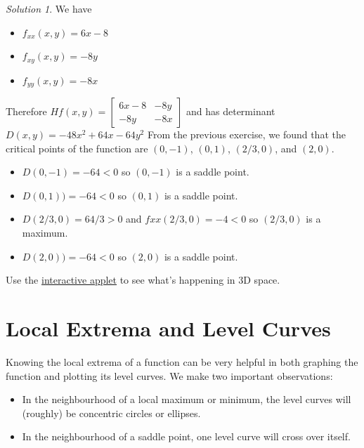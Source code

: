 \documentclass[
]{book}
\providecommand{\tightlist}{%
  \setlength{\itemsep}{0pt}\setlength{\parskip}{0pt}}
\theoremstyle{definition}
\theoremstyle{definition}
\theoremstyle{definition}
\theoremstyle{definition}
\theoremstyle{remark}
\newtheorem*{solution}{Solution}
\begin{document}
\begin{solution}

We have

\begin{itemize}
\tightlist
\item
  \(f_{xx}(x,y)=6x-8\)
\item
  \(f_{xy}(x,y)=-8y\)
\item
  \(f_{yy}(x,y)=-8x\)
\end{itemize}

Therefore \(Hf(x,y)=\begin{bmatrix} 6x-8 & -8y\\-8y & -8x\end{bmatrix}\) and has determinant \(D(x,y)=-48x^2+64x-64y^2\)
From the previous exercise, we found that the critical points of the function are \((0,-1)\), \((0,1)\), \((2/3, 0)\), and \((2,0)\).

\begin{itemize}
\tightlist
\item
  \(D(0,-1)=-64 <0\) so \((0,-1)\) is a saddle point.
\item
  \(D(0,1))=-64 <0\) so \((0, 1)\) is a saddle point.
\item
  \(D(2/3,0)=64/3 >0\) and \(f{xx}(2/3,0)=-4<0\) so \((2/3,0)\) is a maximum.
\item
  \(D(2,0))=-64 <0\) so \((2, 0)\) is a saddle point.
\end{itemize}

Use the \href{https://www.geogebra.org/m/s5jwhxaj}{interactive applet} to see what's happening in 3D space.

\end{solution}

\hypertarget{local-extrema-and-level-curves}{%
\section{Local Extrema and Level Curves}\label{local-extrema-and-level-curves}}

Knowing the local extrema of a function can be very helpful in both graphing the function and plotting its level curves. We make two important observations:

\begin{itemize}
\tightlist
\item
  In the neighbourhood of a local maximum or minimum, the level curves will (roughly) be concentric circles or ellipses.
\item
  In the neighbourhood of a saddle point, one level curve will cross over itself.
\end{itemize}
\end{document}
